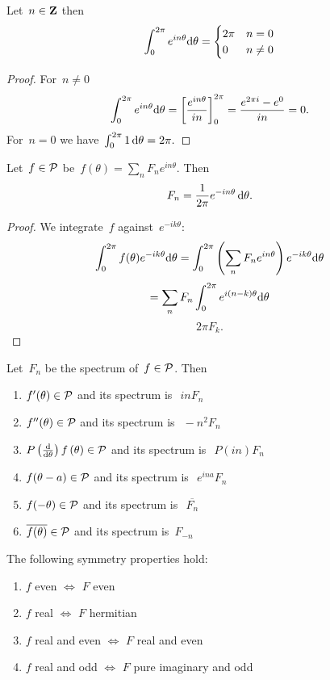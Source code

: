 \begin{lemma}
	Let~$n\in\mathbf{Z}$ then
	$$\int_0^{2\pi}e^{in\theta}\mathrm{d}\theta=
	\begin{cases}
		2\pi & n=0 \\
		0 & n\neq0
	\end{cases}
	$$
\end{lemma}

\begin{proof}
	For~$n\neq 0$
	$$\int_0^{2\pi}e^{in\theta}\mathrm{d}\theta=
	\left[
		\frac{e^{in\theta}}{ in}
		\right]_0^{2\pi}=\frac{e^{2\pi i}-e^0}{in}
	=0.
	$$
	For~$n=0$ we have~$\int_0^{2\pi}1\,\mathrm{d}\theta=2\pi.$
\end{proof}

\begin{proposition}
	Let~$f\in\mathcal{P}$ be~$f(\theta)=\sum_nF_ne^{in\theta}$.
	Then
	$$F_n=\frac{1}{2\pi}e^{-in\theta}\,\mathrm{d}\theta.$$
\end{proposition}

\begin{proof}
	We integrate~$f$ against~$e^{-ik\theta}$:
	$$ \int_0^{2\pi}f(\theta)e^{-ik\theta}\mathrm{d}\theta
	=
	\int_0^{2\pi}\left(\sum_nF_ne^{in\theta}\right)e^{-ik\theta}\mathrm{d}\theta
	$$
	$$=\sum_nF_n\int_0^{2\pi}e^{i(n-k)\theta}\mathrm{d}\theta$$
	$$2\pi F_k.$$
\end{proof}

\begin{proposition}
	Let~$F_n$ be the spectrum of~\mbox{$f\in\mathcal{P}$}.  Then
	\begin{enumerate}
		\item $f'(\theta)\in\mathcal{P}$ and its spectrum is~$\ inF_n$
		\item $f''(\theta)\in\mathcal{P}$ and its spectrum is~$\ -n^2F_n$
		\item $P\left(\frac{\mathrm{d}}{\mathrm{d}\theta}\right)f\,(\theta)\in\mathcal{P}$ and its
		spectrum is~$\ P(in)F_n$
		\item $f(\theta-a)\in\mathcal{P}$ and its spectrum is~$\ e^{ina}F_n$
		\item $f(-\theta)\in\mathcal{P}$ and its spectrum is~$\ \overline{F_n}$
		\item $\overline{f(\theta)}\in\mathcal{P}$ and its spectrum is~$F_{-n}$
	\end{enumerate}
\end{proposition}

\begin{proposition}%
The following symmetry properties hold:
\begin{enumerate}
	\item $f$ even $\iff$ $F$ even
	\item $f$ real $\iff$ $F$ hermitian
	\item $f$ real and even $\iff$ $F$ real and even
	\item $f$ real and odd $\iff$ $F$ pure imaginary and odd
\end{enumerate}
\end{proposition}


